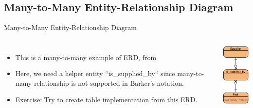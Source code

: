 \documentclass{beamer}
\begin{document}
	\subsection{Many-to-Many Entity-Relationship Diagram}
	\begin{frame}{Many-to-Many Entity-Relationship Diagram}
		\begin{columns}[t,totalwidth=\textwidth]
				\begin{itemize}
					\item This is a many-to-many example of ERD, from \cite{Schach:2006:OCS:1207045}
					\item Here, we need a helper entity ``is\_supplied\_by`` since many-to-many relationship is not supported in Barker's notation.
					\item Exercise: Try to create table implementation from this ERD.
				\end{itemize}
				\begin{flushright}
	            	\includegraphics[scale=0.7]{img/02_many_to_many_erd.png}
				\end{flushright}
		\end{columns}
	\end{frame}
	
\end{document}
